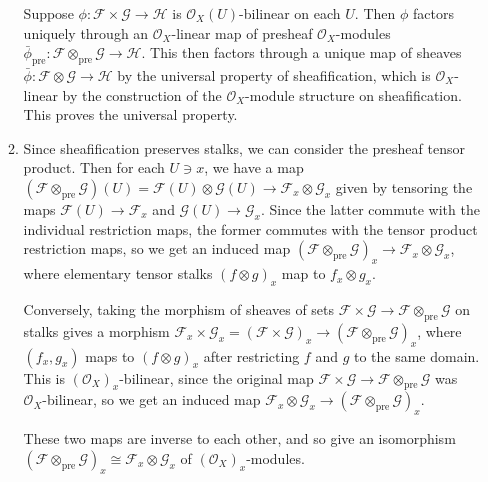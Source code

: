 \documentclass{report}
\newcommand{\induced}[1]{\bar{#1}} %
\newcommand{\pre}{{\mathrm{pre}}} %
\renewcommand{\O}{\mathscr{O}} %
\newcommand{\scrF}{\mathscr{F}}
\newcommand{\scrG}{\mathscr{G}}
\newcommand{\scrH}{\mathscr{H}}
\begin{document}
\begin{enumerate}[label=\textbf{2.6.\Alph*.}]
\begin{enumerate}[label=(\alph*)]
		            Suppose $\phi:\scrF\times\scrG\to\scrH$ is $\O_X(U)$-bilinear on each $U$.
		            Then $\phi$ factors uniquely through an $\O_X$-linear map of
		            presheaf $\O_X$-modules $\induced\phi_\pre:\scrF\otimes_\pre\scrG\to\scrH$.
		            This then factors through a unique map of sheaves
		            $\induced\phi:\scrF\otimes\scrG\to\scrH$ by the universal property of
		            sheafification, which is $\O_X$-linear by the construction of
		            the $\O_X$-module structure on sheafification. This proves the
		            universal property.

		      \item Since sheafification preserves stalks, we can consider the
		            presheaf tensor product. Then for each $U\ni x$, we have a map
		            $(\scrF\otimes_\pre\scrG)(U)=\scrF(U)\otimes\scrG(U)\to\scrF_x\otimes\scrG_x$
		            given by tensoring the maps $\scrF(U)\to\scrF_x$ and $\scrG(U)\to\scrG_x$.
		            Since the latter commute with the individual restriction maps,
		            the former commutes with the tensor product restriction maps, so
		            we get an induced map $(\scrF\otimes_\pre\scrG)_x\to\scrF_x\otimes\scrG_x$,
		            where elementary tensor stalks $(f\otimes g)_x$ map to
		            $f_x\otimes g_x$.

		            Conversely, taking the morphism of sheaves of sets
		            $\scrF\times\scrG\to\scrF\otimes_\pre\scrG$ on stalks gives a morphism
		            $\scrF_x\times\scrG_x=(\scrF\times\scrG)_x\to(\scrF\otimes_\pre\scrG)_x$, where
		            $(f_x,g_x)$ maps to $(f\otimes g)_x$ after restricting $f$ and
		            $g$ to the same domain. This is $(\O_X)_x$-bilinear, since the
		            original map $\scrF\times\scrG\to\scrF\otimes_\pre\scrG$ was $\O_X$-bilinear,
		            so we get an induced map $\scrF_x\otimes\scrG_x\to(\scrF\otimes_\pre\scrG)_x$.

		            These two maps are inverse to each other, and so give an
		            isomorphism $(\scrF\otimes_\pre\scrG)_x\cong\scrF_x\otimes\scrG_x$ of
		            $(\O_X)_x$-modules.
	      \end{enumerate}
\end{enumerate}
\end{document}
